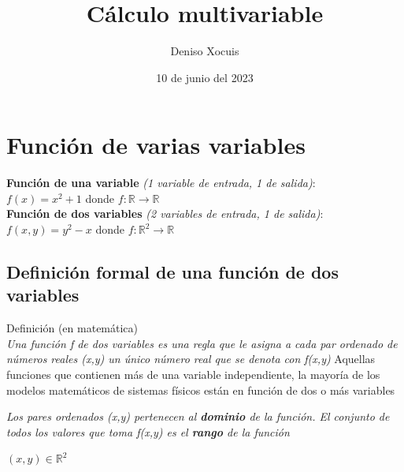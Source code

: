 \documentclass[letterpaper,12pt]{article}
\title {\textbf{Cálculo multivariable}}
\author{Deniso Xocuis}
\date{10 de junio del 2023}
\begin{document}
\maketitle
\thispagestyle{empty}
\newpage
\setcounter{page}{1}
\pagestyle{headings}

\begin{sloppypar} 
\section{Función de varias variables}

\begin{center}
    \textbf{\textcolor[rgb]{0.3,0.6,0.7}{Función de una variable}} \textit{(1 variable de entrada, 1 de salida)}:
    \vspace{0.3cm}\\
    $f(x) = x^2 + 1$ donde $f : \mathbb{R} \rightarrow \mathbb{R} $
    \vspace{0.3cm}\\
    \textbf{\textcolor[rgb]{0.3,0.6,0.7}{Función de dos variables}} \textit{(2 variables de entrada, 1 de salida)}:
    \vspace{0.3cm}\\
    $f(x,y) = y^2 - x$ donde $f : \mathbb{R}^{2} \rightarrow \mathbb{R} $
\end{center}
\subsection{Definición formal de una función de dos variables}
\textcolor[rgb]{0.3,0.6,0.7}{Definición (en matemática)}
\vspace{0.3cm}\\
\textit{Una función f de dos variables es una regla que le asigna a cada par ordenado de números reales (x,y) un único número real que se denota con f(x,y)}
Aquellas funciones que contienen más de una variable independiente, la mayoría de los modelos matemáticos de sistemas físicos están en función de dos o más variables

\hspace{0.5cm} \textit{Los pares ordenados (x,y) pertenecen al \textbf{dominio} de la función. El conjunto de todos los valores que toma f(x,y) es el \textbf{rango} de la función} %

\begin{center}
    $(x,y) \in \mathbb{R}^2$
    

\end{center}
\end{sloppypar}
\end{document}
